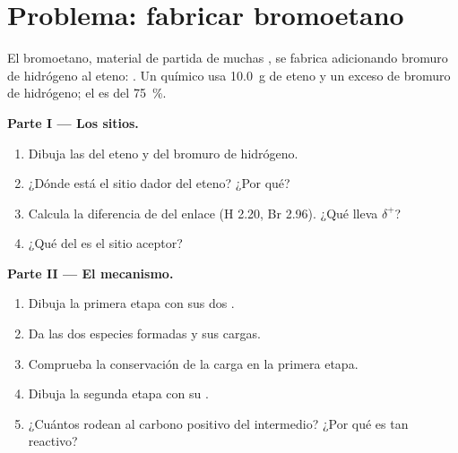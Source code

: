 \section{Problema: fabricar bromoetano}

\begin{problem}
\label{pb:g12:curly-arrows:1}
El bromoetano, material de partida de muchas , se fabrica
adicionando bromuro de hidrógeno al eteno: .
Un químico usa \qty{10.0}{g} de eteno y un exceso de bromuro de
hidrógeno; el  es del \qty{75}{\percent}.

\medskip
\noindent\textbf{Parte I --- Los sitios.}
\begin{enumerate}
  \item Dibuja las  del eteno y del bromuro de
        hidrógeno.
  \item ¿Dónde está el sitio dador del eteno? ¿Por qué?
  \item Calcula la diferencia de  del enlace 
        (H 2.20, Br 2.96). ¿Qué  lleva $\delta^+$?
  \item ¿Qué  del  es el sitio aceptor?
\end{enumerate}

\medskip
\noindent\textbf{Parte II --- El mecanismo.}
\begin{enumerate}[resume]
  \item Dibuja la primera etapa con sus dos .
  \item Da las dos especies formadas y sus cargas.
  \item Comprueba la conservación de la carga en la primera etapa.
  \item Dibuja la segunda etapa con su .
  \item ¿Cuántos  rodean al carbono positivo del intermedio?
        ¿Por qué es tan reactivo?
\end{enumerate}


\end{problem}
